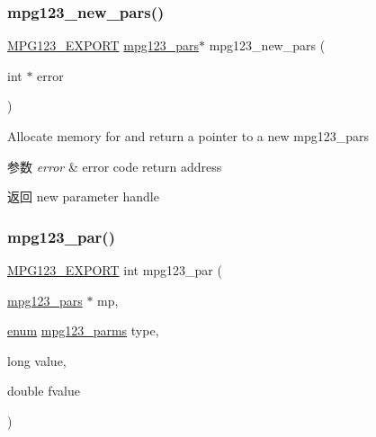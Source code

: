 \subsubsection{\texorpdfstring{mpg123\+\_\+new\+\_\+pars()}{mpg123\_new\_pars()}}
{\footnotesize\ttfamily \hyperlink{mpg123_8h_a2ba98cfba3f760879df70e755b2a61cc}{M\+P\+G123\+\_\+\+E\+X\+P\+O\+RT} \hyperlink{group__mpg123__advpar_ga3983578625af3bb6dc7e3b74d0cab4aa}{mpg123\+\_\+pars}$\ast$ mpg123\+\_\+new\+\_\+pars (\begin{DoxyParamCaption}\item[{int $\ast$}]{error }\end{DoxyParamCaption})}

Allocate memory for and return a pointer to a new mpg123\+\_\+pars 
\begin{DoxyParams}{参数}
{\em error} & error code return address \\
\hline
\end{DoxyParams}
\begin{DoxyReturn}{返回}
new parameter handle 
\end{DoxyReturn}
\mbox{\label{group__mpg123__advpar_gacf5f968dde49b648327ef601d9ff0367}} 
\subsubsection{\texorpdfstring{mpg123\+\_\+par()}{mpg123\_par()}}
{\footnotesize\ttfamily \hyperlink{mpg123_8h_a2ba98cfba3f760879df70e755b2a61cc}{M\+P\+G123\+\_\+\+E\+X\+P\+O\+RT} int mpg123\+\_\+par (\begin{DoxyParamCaption}\item[{\hyperlink{group__mpg123__advpar_ga3983578625af3bb6dc7e3b74d0cab4aa}{mpg123\+\_\+pars} $\ast$}]{mp,  }\item[{\hyperlink{interfaceenum}{enum} \hyperlink{group__mpg123__init_ga73a8ff3363028b89afc72b3ea032b9cb}{mpg123\+\_\+parms}}]{type,  }\item[{long}]{value,  }\item[{double}]{fvalue }\end{DoxyParamCaption})}

